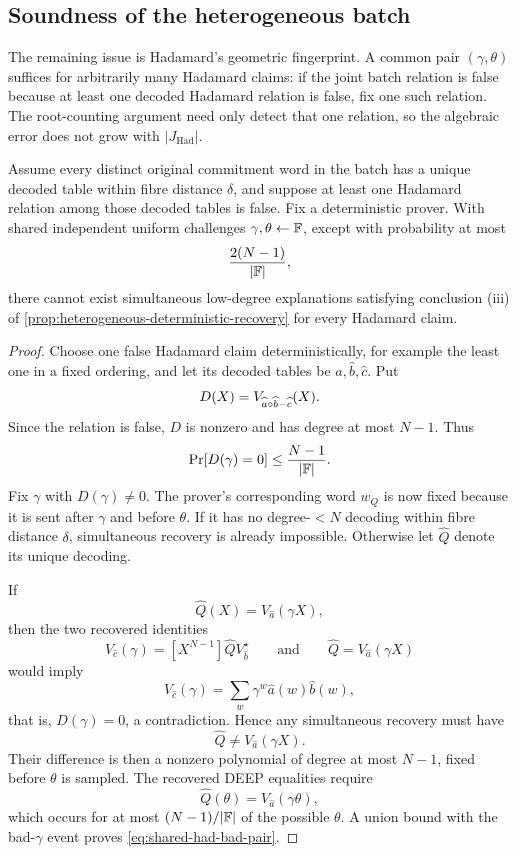 \subsection{Soundness of the heterogeneous batch}
\label{sec:heterogeneous-soundness}

The remaining issue is Hadamard's geometric fingerprint.  A common pair $(\gamma,\theta)$ suffices for arbitrarily many Hadamard claims: if the joint batch relation is false because at least one decoded Hadamard relation is false, fix one such relation.  The root-counting argument need only detect that one relation, so the algebraic error does not grow with $|J_{\mathrm{Had}}|$.

\begin{lemma}
\label{lem:shared-hadamard-fingerprint}
Assume every distinct original commitment word in the batch has a unique decoded table within fibre distance $\delta$, and suppose at least one Hadamard relation among those decoded tables is false.  Fix a deterministic prover.  With shared independent uniform challenges $\gamma,\theta\leftarrow\mathbb{F}$, except with probability at most
\begin{equation}
  \frac{2(N-1)}{|\mathbb{F}|},
  \label{eq:shared-had-bad-pair}
\end{equation}
there cannot exist simultaneous low-degree explanations satisfying conclusion (iii) of \cref{prop:heterogeneous-deterministic-recovery} for every Hadamard claim.
\end{lemma}

\begin{proof}
Choose one false Hadamard claim deterministically, for example the least one in a fixed ordering, and let its decoded tables be $\widehat a,\widehat b,\widehat c$.  Put
\[
  D(X)=V_{\widehat a\circ\widehat b-\widehat c}(X).
\]
Since the relation is false, $D$ is nonzero and has degree at most $N-1$.  Thus
\[
  \Pr[D(\gamma)=0]\le\frac{N-1}{|\mathbb{F}|}.
\]
Fix $\gamma$ with $D(\gamma)\ne0$.  The prover's corresponding word $w_Q$ is now fixed because it is sent after $\gamma$ and before $\theta$.  If it has no degree-$<N$ decoding within fibre distance $\delta$, simultaneous recovery is already impossible.  Otherwise let $\widehat Q$ denote its unique decoding.

If
\[
  \widehat Q(X)=V_{\widehat a}(\gamma X),
\]
then the two recovered identities
\[
  V_{\widehat c}(\gamma)
  =[X^{N-1}]\widehat QV_{\widehat b}^{\star}
  \qquad\text{and}\qquad
  \widehat Q=V_{\widehat a}(\gamma X)
\]
would imply
\[
  V_{\widehat c}(\gamma)
  =\sum_w\gamma^w\widehat a(w)\widehat b(w),
\]
that is, $D(\gamma)=0$, a contradiction.  Hence any simultaneous recovery must have
\[
  \widehat Q\ne V_{\widehat a}(\gamma X).
\]
Their difference is then a nonzero polynomial of degree at most $N-1$, fixed before $\theta$ is sampled.  The recovered DEEP equalities require
\[
  \widehat Q(\theta)=V_{\widehat a}(\gamma\theta),
\]
which occurs for at most $(N-1)/|\mathbb{F}|$ of the possible $\theta$.  A union bound with the bad-$\gamma$ event proves \eqref{eq:shared-had-bad-pair}.
\end{proof}

